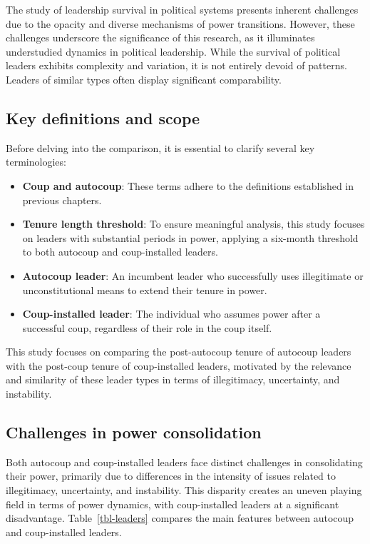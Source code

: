 \documentclass[
  12pt,
]{report}
\begin{document}
The study of leadership survival in political systems presents inherent
challenges due to the opacity and diverse mechanisms of power
transitions. However, these challenges underscore the significance of
this research, as it illuminates understudied dynamics in political
leadership. While the survival of political leaders exhibits complexity
and variation, it is not entirely devoid of patterns. Leaders of similar
types often display significant comparability.

\subsection{Key definitions and scope}\label{key-definitions-and-scope}

Before delving into the comparison, it is essential to clarify several
key terminologies:

\begin{itemize}
\item
  \textbf{Coup and autocoup}: These terms adhere to the definitions
  established in previous chapters.
\item
  \textbf{Tenure length threshold}: To ensure meaningful analysis, this
  study focuses on leaders with substantial periods in power, applying a
  six-month threshold to both autocoup and coup-installed leaders.
\item
  \textbf{Autocoup leader}: An incumbent leader who successfully uses
  illegitimate or unconstitutional means to extend their tenure in
  power.
\item
  \textbf{Coup-installed leader}: The individual who assumes power after
  a successful coup, regardless of their role in the coup itself.
\end{itemize}

This study focuses on comparing the post-autocoup tenure of autocoup
leaders with the post-coup tenure of coup-installed leaders, motivated
by the relevance and similarity of these leader types in terms of
illegitimacy, uncertainty, and instability.

\subsection{Challenges in power
consolidation}\label{challenges-in-power-consolidation}

Both autocoup and coup-installed leaders face distinct challenges in
consolidating their power, primarily due to differences in the intensity
of issues related to illegitimacy, uncertainty, and instability. This
disparity creates an uneven playing field in terms of power dynamics,
with coup-installed leaders at a significant disadvantage.
Table~\ref{tbl-leaders} compares the main features between autocoup and
coup-installed leaders.
\end{document}
